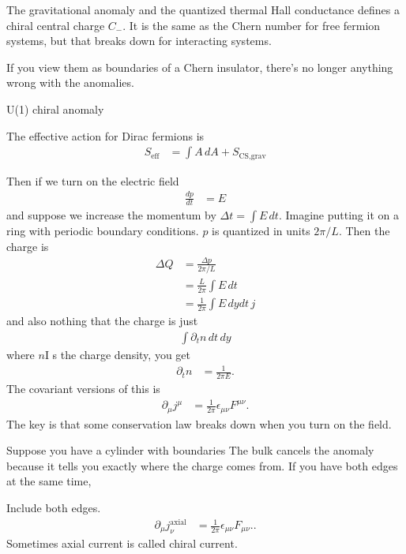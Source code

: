 The gravitational anomaly and the quantized thermal Hall conductance
defines a chiral central charge $C_{-}$.
It is the same as the Chern number for free fermion systems,
but that breaks down for interacting systems.

If you view them as boundaries of a Chern insulator,
there's no longer anything wrong with the anomalies.

U(1) chiral anomaly

The effective action for Dirac fermions is
\begin{align}
    S_{\mathrm{eff}} &=
    \int A\, dA
    + S_{\textrm{CS,grav}}
\end{align}

Then if we turn on the electric field
\begin{align}
    \frac{dp}{dt} &= E
\end{align}
and suppose we increase the momentum by $\Delta t= \int E\, dt$.
Imagine putting it on a  ring with periodic boundary conditions.
$p$ is quantized in units $2\pi/L$.
Then the charge is
\begin{align}
    \Delta Q &=
    \frac{\Delta p}{2\pi /L}\\
    &= \frac{L}{2\pi} \int E\, dt\\
    &= \frac{1}{2\pi} \int E\, dy dt\, j
\end{align}
and also nothing that the charge is just
\begin{align}
    \int \partial_t n \, dt\, dy
\end{align}
where $n$I s the charge density,
you get
\begin{align}
    \partial_t n &= \frac{1}{2\pi E}.
\end{align}
The covariant versions of this is
\begin{align}
    \partial_\mu j^\mu &= \frac{1}{2\pi}\epsilon_{\mu\nu}F^{\mu\nu}.
\end{align}
The key is that some conservation law breaks down when you turn on the field.

Suppose you have a cylinder with boundaries 
The bulk cancels the anomaly because it tells you exactly where the charge comes
from.
If you have both edges at the same time,

Include both edges.
\begin{align}
    \partial_\mu j_{\nu}^{\mathrm{axial}} &=
    \frac{1}{2\pi} \epsilon_{\mu\nu} F_{\mu\nu}..
\end{align}
Sometimes axial current is called chiral current.

